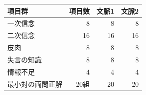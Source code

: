\begin{tabular}{lrrr}\toprule
項目群 & 項目数 & 文脈1 & 文脈2\\\midrule
一次信念 & 8 & 8 & 8\\
二次信念 & 16 & 16 & 16\\
皮肉 & 8 & 8 & 8\\
失言の知識 & 8 & 8 & 8\\
情報不足 & 4 & 4 & 4\\
\midrule
最小対の両問正解 & 20組 & 20 & 20\\
\bottomrule\end{tabular}
